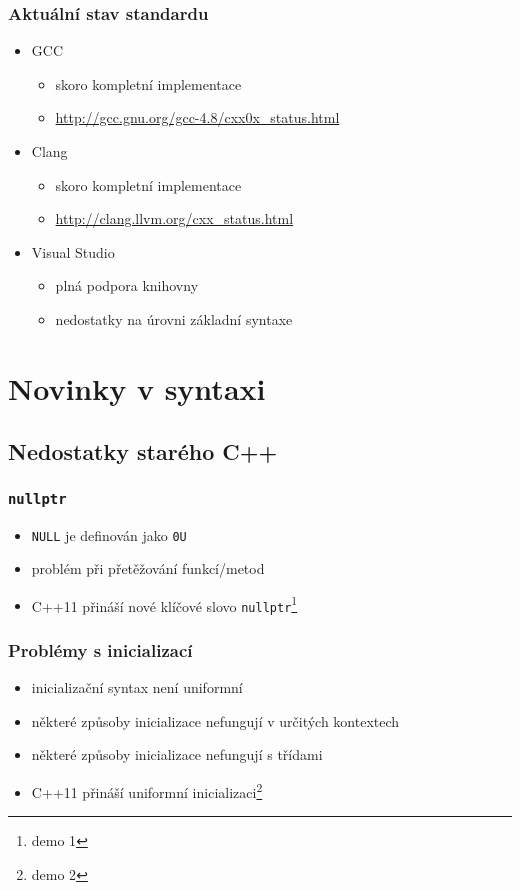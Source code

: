 \begin{frame} \frametitle{Aktuální stav standardu}
	\begin{itemize}
		\item{GCC}
		\begin{itemize}
			\item skoro kompletní implementace
			\item \url{http://gcc.gnu.org/gcc-4.8/cxx0x\_status.html}
		\end{itemize}

		\item{Clang}
		\begin{itemize}
			\item skoro kompletní implementace
			\item \url{http://clang.llvm.org/cxx\_status.html}
		\end{itemize}

		\item Visual Studio
		\begin{itemize}
			\item plná podpora knihovny
			\item nedostatky na úrovni základní syntaxe
		\end{itemize}
	\end{itemize}
\end{frame}

\section{Novinky v syntaxi}

\subsection{Nedostatky starého C++}

\begin{frame} \frametitle{\texttt{nullptr}}
	\begin{itemize}
		\item \texttt{NULL} je definován jako \texttt{0U}
		\item problém při přetěžování funkcí/metod
		\item C++11 přináší nové klíčové slovo \texttt{nullptr}\footnote{demo 1}
	\end{itemize}
\end{frame}

\begin{frame} \frametitle{Problémy s inicializací}
	\begin{itemize}
		\item inicializační syntax není uniformní
		\item některé způsoby inicializace nefungují v určitých kontextech
		\item některé způsoby inicializace nefungují s třídami
		\item C++11 přináší uniformní inicializaci\footnote{demo 2}
	\end{itemize}
\end{frame}

